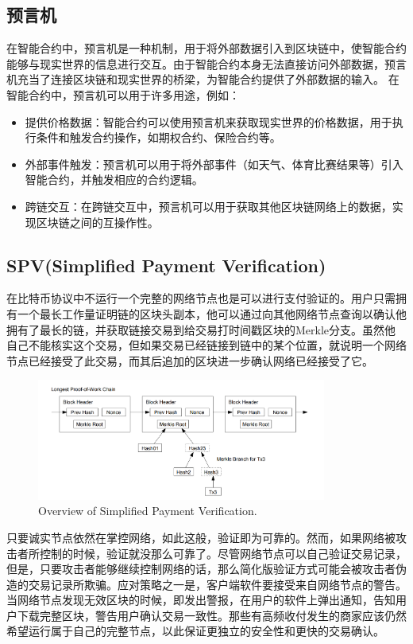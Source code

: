 \documentclass{article}
\begin{document}
\subsection{预言机}
\par 在智能合约中，预言机是一种机制，用于将外部数据引入到区块链中，使智能合约能够与现实世界的信息进行交互。由于智能合约本身无法直接访问外部数据，预言机充当了连接区块链和现实世界的桥梁，为智能合约提供了外部数据的输入\cite{oralce}。
在智能合约中，预言机可以用于许多用途，例如：
\begin{itemize}
    \item 提供价格数据：智能合约可以使用预言机来获取现实世界的价格数据，用于执行条件和触发合约操作，如期权合约、保险合约等。
    \item 外部事件触发：预言机可以用于将外部事件（如天气、体育比赛结果等）引入智能合约，并触发相应的合约逻辑。
    \item 跨链交互：在跨链交互中，预言机可以用于获取其他区块链网络上的数据，实现区块链之间的互操作性。
\end{itemize}
\subsection{SPV(Simplified Payment Verification)}
\par 在比特币协议中不运行一个完整的网络节点也是可以进行支付验证的。用户只需拥有一个最长工作量证明链的区块头副本，他可以通过向其他网络节点查询以确认他拥有了最长的链，并获取链接交易到给交易打时间戳区块的Merkle分支。虽然他自己不能核实这个交易，但如果交易已经链接到链中的某个位置，就说明一个网络节点已经接受了此交易，而其后追加的区块进一步确认网络已经接受了它。\cite{spv}
\begin{figure}[h]
\centering
\includegraphics[width=0.85\textwidth]{spv.png}
\caption{\label{fig:spv}Overview of Simplified Payment Verification.}
\end{figure}
\par 只要诚实节点依然在掌控网络，如此这般，验证即为可靠的。然而，如果网络被攻击者所控制的时候，验证就没那么可靠了。尽管网络节点可以自己验证交易记录，但是，只要攻击者能够继续控制网络的话，那么简化版验证方式可能会被攻击者伪造的交易记录所欺骗。应对策略之一是，客户端软件要接受来自网络节点的警告。当网络节点发现无效区块的时候，即发出警报，在用户的软件上弹出通知，告知用户下载完整区块，警告用户确认交易一致性。那些有高频收付发生的商家应该仍然希望运行属于自己的完整节点，以此保证更独立的安全性和更快的交易确认。
\end{document}
